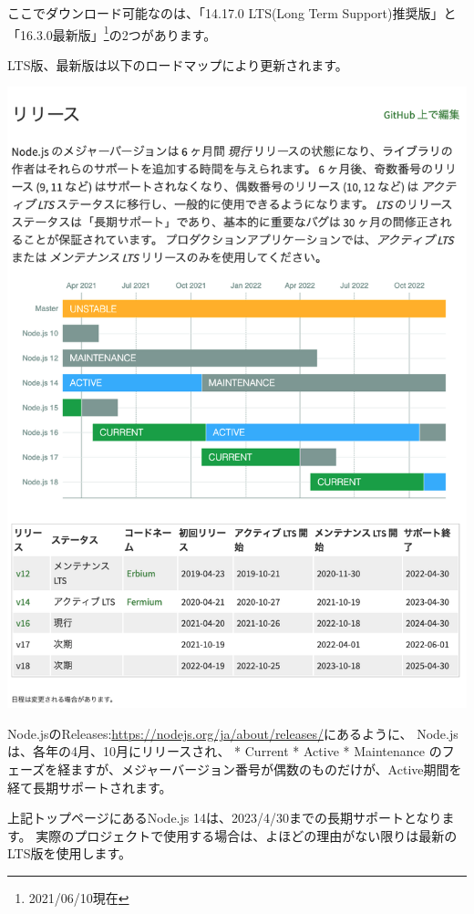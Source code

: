 ここでダウンロード可能なのは、「14.17.0 LTS(Long Term Support)推奨版」と「16.3.0最新版」\footnote{2021/06/10現在}の2つがあります。

LTS版、最新版は以下のロードマップにより更新されます。

\begin{reviewimage}[H]%
\includegraphics[width=1.0\maxwidth]{./images/01-createDevEnv/01_02nodejsRoadmap.png}%
\label{image:01-createDevEnv:01_02nodejsRoadmap}
\end{reviewimage}

\clearpage


Node.jsのReleases:\url{https://nodejs.org/ja/about/releases/}にあるように、
Node.jsは、各年の4月、10月にリリースされ、
* Current
* Active
* Maintenance
のフェーズを経ますが、メジャーバージョン番号が偶数のものだけが、Active期間を経て長期サポートされます。

上記トップページにあるNode.js 14は、2023/4/30までの長期サポートとなります。
実際のプロジェクトで使用する場合は、よほどの理由がない限りは最新のLTS版を使用します。


